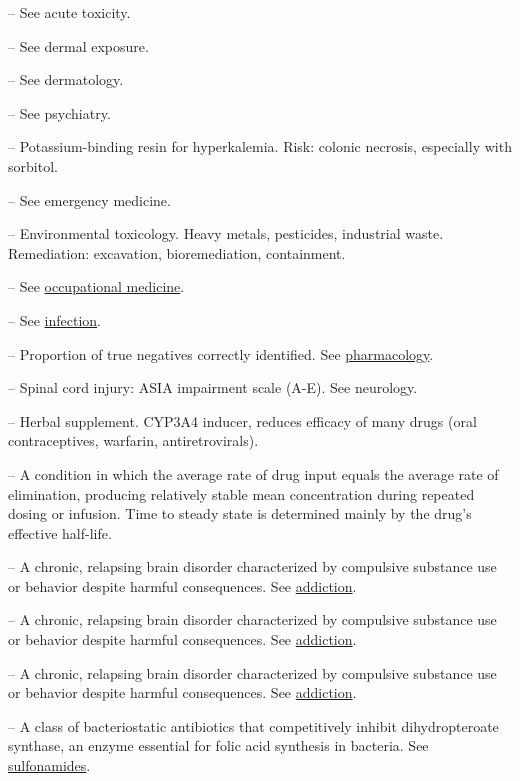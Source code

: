 -- See acute toxicity.

-- See dermal exposure.

-- See dermatology.

-- See psychiatry.

-- Potassium-binding resin for hyperkalemia. Risk: colonic necrosis, especially with sorbitol.

-- See emergency medicine.

-- Environmental toxicology. Heavy metals, pesticides, industrial waste. Remediation: excavation, bioremediation, containment.

-- See \hyperlink{Occupational Medicine}{occupational medicine}.

-- See \hyperlink{Infection}{infection}.

-- Proportion of true negatives correctly identified. See \hyperlink{Pharmacology}{pharmacology}.

-- Spinal cord injury: ASIA impairment scale (A-E). See neurology.

-- Herbal supplement. CYP3A4 inducer, reduces efficacy of many drugs (oral contraceptives, warfarin, antiretrovirals).

-- A condition in which the average rate of drug input equals the average rate of elimination, producing relatively stable mean concentration during repeated dosing or infusion. Time to steady state is determined mainly by the drug’s effective half-life.

-- A chronic, relapsing brain disorder characterized by compulsive substance use or behavior despite harmful consequences. See \hyperlink{Addiction}{addiction}.

-- A chronic, relapsing brain disorder characterized by compulsive substance use or behavior despite harmful consequences. See \hyperlink{Addiction}{addiction}.

-- A chronic, relapsing brain disorder characterized by compulsive substance use or behavior despite harmful consequences. See \hyperlink{Addiction}{addiction}.

-- A class of bacteriostatic antibiotics that competitively inhibit dihydropteroate synthase, an enzyme essential for folic acid synthesis in bacteria. See \hyperlink{Sulfonamides}{sulfonamides}.

